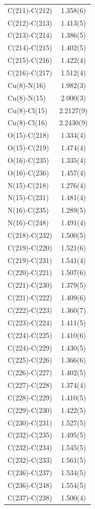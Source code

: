 \begin{center}
{\begin{supertabular}{p{1.5in}c}
C(211)-C(212) &1.358(6)\\
C(212)-C(213) &1.413(5)\\
C(213)-C(214) &1.386(5)\\
C(214)-C(215) &1.402(5)\\
C(215)-C(216) &1.422(4)\\
C(216)-C(217) &1.512(4)\\
Cu(8)-N(16) &1.982(3)\\
Cu(8)-N(15) &2.000(3)\\
Cu(8)-Cl(15) &2.2127(9)\\
Cu(8)-Cl(16) &2.2430(9)\\
O(15)-C(218) &1.334(4)\\
O(15)-C(219) &1.474(4)\\
O(16)-C(235) &1.335(4)\\
O(16)-C(236) &1.457(4)\\
N(15)-C(218) &1.276(4)\\
N(15)-C(231) &1.481(4)\\
N(16)-C(235) &1.289(5)\\
N(16)-C(248) &1.491(4)\\
C(218)-C(232) &1.500(5)\\
C(219)-C(220) &1.521(6)\\
C(219)-C(231) &1.541(4)\\
C(220)-C(221) &1.507(6)\\
C(221)-C(230) &1.379(5)\\
C(221)-C(222) &1.409(6)\\
C(222)-C(223) &1.360(7)\\
C(223)-C(224) &1.411(5)\\
C(224)-C(225) &1.410(6)\\
C(224)-C(229) &1.430(5)\\
C(225)-C(226) &1.366(6)\\
C(226)-C(227) &1.402(5)\\
C(227)-C(228) &1.374(4)\\
C(228)-C(229) &1.410(5)\\
C(229)-C(230) &1.422(5)\\
C(230)-C(231) &1.527(5)\\
C(232)-C(235) &1.495(5)\\
C(232)-C(234) &1.545(5)\\
C(232)-C(233) &1.561(5)\\
C(236)-C(237) &1.534(5)\\
C(236)-C(248) &1.554(5)\\
C(237)-C(238) &1.500(4)\\

\end{supertabular}}
\end{center}
